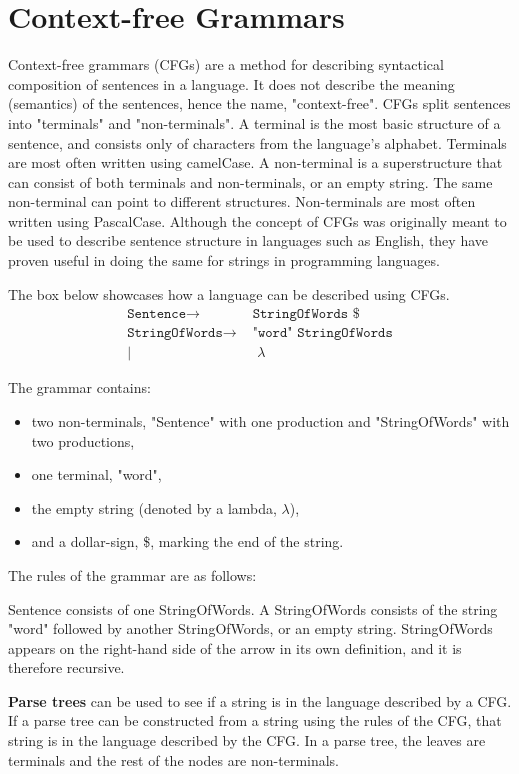 \section{Context-free Grammars}
\label{CFGdescription}
Context-free grammars (CFGs) are a method for describing syntactical composition of sentences in a language.
It does not describe the meaning (semantics) of the sentences, hence the name, "context-free".
CFGs split sentences into "terminals" and "non-terminals".
A terminal is the most basic structure of a sentence, and consists only of characters from the language's alphabet.
Terminals are most often written using camelCase.
A non-terminal is a superstructure that can consist of both terminals and non-terminals, or an empty string.
The same non-terminal can point to different structures.
Non-terminals are most often written using PascalCase.
Although the concept of CFGs was originally meant to be used to describe sentence structure in languages such as English, they have proven useful in doing the same for strings in programming languages.
\cite{SebestaGrammar}

The box below showcases how a language can be described using CFGs.
\begin{align*}
	\texttt{Sentence}\to & \texttt{ StringOfWords \$}\\
	\texttt{StringOfWords}\to & \texttt{ "word" StringOfWords}\\
	| & \texttt{ }\lambda
\end{align*}

The grammar contains:
\begin{itemize}
	\item two non-terminals, "Sentence" with one production and "StringOfWords" with two productions,
	\item one terminal, "word",
	\item the empty string (denoted by a lambda, $\lambda$),
	\item and a dollar-sign, \$, marking the end of the string.
\end{itemize}

The rules of the grammar are as follows:

Sentence consists of one StringOfWords. 
A StringOfWords consists of the string "word" followed by another StringOfWords, or an empty string.
StringOfWords appears on the right-hand side of the arrow in its own definition, and it is therefore recursive.

\textbf{Parse trees} can be used to see if a string is in the language described by a CFG.
If a parse tree can be constructed from a string using the rules of the CFG, that string is in the language described by the CFG. 
In a parse tree, the leaves are terminals and the rest of the nodes are non-terminals.
\cite{SebestaParsetrees}

